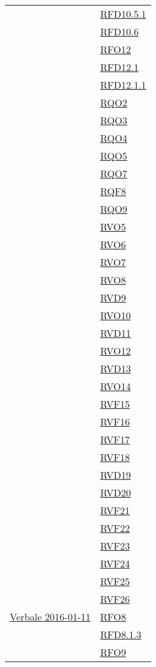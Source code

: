 \begin{longtable}{|>{\centering}m{5cm}|m{5cm}<{\centering}|}
& \hyperlink{RFD10.5.1}{RFD10.5.1}\\
& \hyperlink{RFD10.6}{RFD10.6}\\
& \hyperlink{RFO12}{RFO12}\\
& \hyperlink{RFD12.1}{RFD12.1}\\
& \hyperlink{RFD12.1.1}{RFD12.1.1}\\
& \hyperlink{RQO2}{RQO2}\\
& \hyperlink{RQO3}{RQO3}\\
& \hyperlink{RQO4}{RQO4}\\
& \hyperlink{RQO5}{RQO5}\\
& \hyperlink{RQO7}{RQO7}\\
& \hyperlink{RQF8}{RQF8}\\
& \hyperlink{RQO9}{RQO9}\\
& \hyperlink{RVO5}{RVO5}\\
& \hyperlink{RVO6}{RVO6}\\
& \hyperlink{RVO7}{RVO7}\\
& \hyperlink{RVO8}{RVO8}\\
& \hyperlink{RVD9}{RVD9}\\
& \hyperlink{RVO10}{RVO10}\\
& \hyperlink{RVD11}{RVD11}\\
& \hyperlink{RVO12}{RVO12}\\
& \hyperlink{RVD13}{RVD13}\\
& \hyperlink{RVO14}{RVO14}\\
& \hyperlink{RVF15}{RVF15}\\
& \hyperlink{RVF16}{RVF16}\\
& \hyperlink{RVF17}{RVF17}\\
& \hyperlink{RVF18}{RVF18}\\
& \hyperlink{RVD19}{RVD19}\\
& \hyperlink{RVD20}{RVD20}\\
& \hyperlink{RVF21}{RVF21}\\
& \hyperlink{RVF22}{RVF22}\\
& \hyperlink{RVF23}{RVF23}\\
& \hyperlink{RVF24}{RVF24}\\
& \hyperlink{RVF25}{RVF25}\\
& \hyperlink{RVF26}{RVF26}\\ \hline
\hyperlink{Verbale 2016-01-11}{Verbale 2016-01-11} & \hyperlink{RFO8}{RFO8}\\
& \hyperlink{RFD8.1.3}{RFD8.1.3}\\
& \hyperlink{RFO9}{RFO9}\\

\end{longtable}
